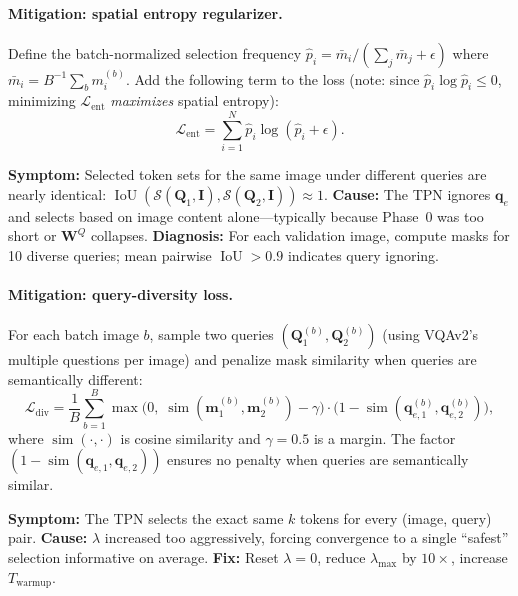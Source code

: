 \documentclass[11pt,a4paper]{article}
\DeclareMathOperator{\IoU}{IoU}
\DeclareMathOperator{\simop}{sim}
\newcommand{\vq}{\mathbf{q}}
\newcommand{\vm}{\mathbf{m}}        %
\newcommand{\mI}{\mathbf{I}}
\newcommand{\mQ}{\mathbf{Q}}
\begin{document}
\paragraph{Mitigation: spatial entropy regularizer.}
Define the batch-normalized selection frequency
$\hat{p}_i = \bar{m}_i/(\sum_j\bar{m}_j+\epsilon)$ where
$\bar{m}_i = B^{-1}\sum_b m_i^{(b)}$. Add the following term to the loss
(note: since $\hat{p}_i\log\hat{p}_i\leq0$, minimizing $\mathcal{L}_{\mathrm{ent}}$
\emph{maximizes} spatial entropy):
\begin{equation}
  \mathcal{L}_{\mathrm{ent}}
  = \sum_{i=1}^{N}\hat{p}_i\log(\hat{p}_i+\epsilon).
  \label{eq:entropy_reg}
\end{equation}

\begin{warnbox}[title={Failure Mode 2: Query Ignoring}]
\textbf{Symptom:} Selected token sets for the same image under different queries
are nearly identical: $\IoU(\mathcal{S}(\mQ_1,\mI),\mathcal{S}(\mQ_2,\mI))\approx1$.
\textbf{Cause:} The TPN ignores $\vq_e$ and selects based on image content
alone---typically because Phase~0 was too short or $\mathbf{W}^Q$ collapses.
\textbf{Diagnosis:} For each validation image, compute masks for 10 diverse
queries; mean pairwise $\IoU>0.9$ indicates query ignoring.
\end{warnbox}

\paragraph{Mitigation: query-diversity loss.}
For each batch image $b$, sample two queries $(\mQ_1^{(b)},\mQ_2^{(b)})$
(using VQAv2's multiple questions per image) and penalize mask similarity when
queries are semantically different:
\begin{equation}
  \mathcal{L}_{\mathrm{div}}
  = \frac{1}{B}\sum_{b=1}^B
    \max\!\bigl(0,\;\simop(\vm_1^{(b)},\vm_2^{(b)})-\gamma\bigr)
    \cdot\bigl(1-\simop(\vq_{e,1}^{(b)},\vq_{e,2}^{(b)})\bigr),
  \label{eq:div_loss}
\end{equation}
where $\simop(\cdot,\cdot)$ is cosine similarity and $\gamma{=}0.5$ is a margin.
The factor $(1-\simop(\vq_{e,1},\vq_{e,2}))$ ensures no penalty when queries
are semantically similar.

\begin{warnbox}[title={Failure Mode 3: Degenerate Fixed Mask}]
\textbf{Symptom:} The TPN selects the exact same $k$ tokens for every
(image, query) pair. \textbf{Cause:} $\lambda$ increased too aggressively,
forcing convergence to a single ``safest'' selection informative on average.
\textbf{Fix:} Reset $\lambda{=}0$, reduce $\lambda_{\max}$ by $10{\times}$,
increase $T_{\mathrm{warmup}}$.
\end{warnbox}
\end{document}
